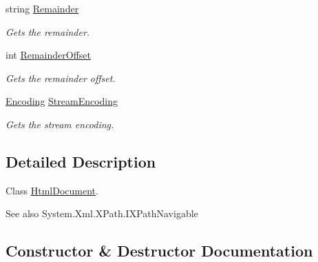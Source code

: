 \begin{DoxyCompactItemize}
string \hyperlink{class_html_agility_pack_1_1_html_document_a2ccaa3304dba0dc11d2e86582f98247e}{Remainder}
\begin{DoxyCompactList}\small\item\em Gets the remainder. \end{DoxyCompactList}\item 
int \hyperlink{class_html_agility_pack_1_1_html_document_a8d46363b2c1cfa924406eb30c69fcf73}{Remainder\+Offset}
\begin{DoxyCompactList}\small\item\em Gets the remainder offset. \end{DoxyCompactList}\item 
\hyperlink{class_html_agility_pack_1_1_html_document_a220bdf28a5e35f4898075084be2d59f0}{Encoding} \hyperlink{class_html_agility_pack_1_1_html_document_a6fb094d01a9a36494a0cbeadb80def06}{Stream\+Encoding}
\begin{DoxyCompactList}\small\item\em Gets the stream encoding. \end{DoxyCompactList}\end{DoxyCompactItemize}


\subsection{Detailed Description}
Class \hyperlink{class_html_agility_pack_1_1_html_document}{Html\+Document}. 

\begin{DoxySeeAlso}{See also}
System.\+Xml.\+X\+Path.\+I\+X\+Path\+Navigable


\end{DoxySeeAlso}


\subsection{Constructor \& Destructor Documentation}
\mbox{\label{class_html_agility_pack_1_1_html_document_a673cbe870195a2a6badbea6508a77ebe}} 
